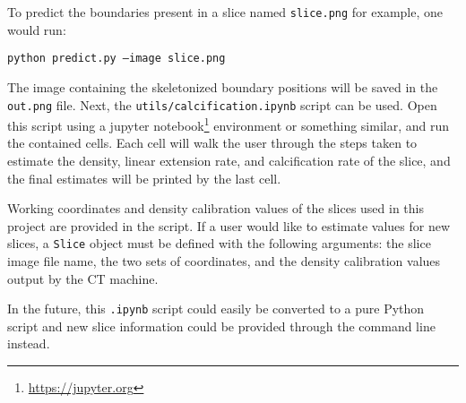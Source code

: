 To predict the boundaries present in a slice named \texttt{slice.png} for example, one would run:

\texttt{python predict.py --image slice.png}

The image containing the skeletonized boundary positions will be saved in the \texttt{out.png} file. Next, the \texttt{utils/calcification.ipynb} script can be used. Open this script using a jupyter notebook\footnote{\url{https://jupyter.org}} environment or something similar, and run the contained cells. Each cell will walk the user through the steps taken to estimate the density, linear extension rate, and calcification rate of the slice, and the final estimates will be printed by the last cell.

Working coordinates and density calibration values of the slices used in this project are provided in the script. If a user would like to estimate values for new slices, a \texttt{Slice} object must be defined with the following arguments: the slice image file name, the two sets of coordinates, and the density calibration values output by the CT machine.

In the future, this \texttt{.ipynb} script could easily be converted to a pure Python script and new slice information could be provided through the command line instead.